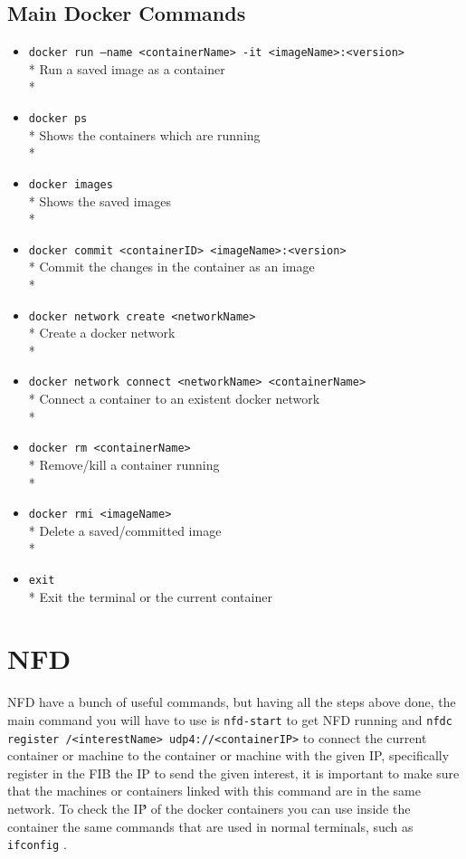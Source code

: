 \documentclass[10pt,letterpaper,extrafontsizes]{memoir}
\begin{document}
\subsection{Main Docker Commands}
\begin{itemize}
 \item \texttt{docker run --name <containerName> -it <imageName>:<version>}\\*
 Run a saved image as a container \\*
 \item \texttt{docker ps}\\*
 Shows the containers which are running \\*
 \item \texttt{docker images} \\*
 Shows the saved images \\*
 \item \texttt{docker commit <containerID>  <imageName>:<version>}\\*
 Commit the changes in the container as an image \\*
 \item \texttt{docker network create <networkName>}\\*
 Create a docker network \\*
 \item \texttt{docker network connect <networkName> <containerName>}\\*
 Connect a container to an existent docker network \\*
 \item \texttt{docker rm <containerName>}\\*
 Remove/kill a container running \\*
 \item \texttt{docker rmi <imageName>}\\*
 Delete a saved/committed image \\*
 \item \texttt{exit} \\*
 Exit the terminal or the current container
\end{itemize}


\section{NFD}
NFD have a bunch of useful commands, but having all the steps above done, the main command you will have to use is \texttt{nfd-start} to get NFD running and \texttt{nfdc register /<interestName> udp4://<containerIP>} to connect the current container or machine to the container or machine with the given IP, specifically register in the FIB the IP to send the given interest, it is important to make sure that the machines or containers linked with this command are in the same network.
To check the IṔ of the docker containers you can use inside the container the same commands that are used in normal terminals, such as \texttt{ifconfig} .
\end{document}
